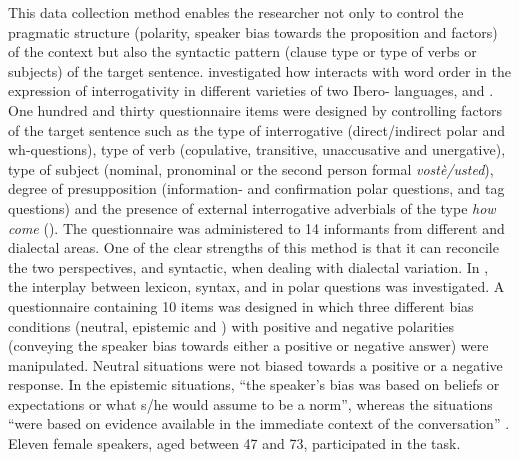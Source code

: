 \documentclass[output=paper]{LSP/langsci}
\begin{document}
This data collection method enables the researcher not only to control the pragmatic structure (polarity, speaker bias towards the proposition and  factors) of the context but also the syntactic pattern (clause type or type of verbs or subjects) of the target sentence. \citet{Vanrell2014dialectinterrogatives} investigated how  interacts with word order in the expression of interrogativity in different varieties of two Ibero- languages,  and . One hundred and thirty questionnaire items were designed by controlling factors of the target sentence such as the type of interrogative (direct/indirect polar and wh-questions), type of verb (copulative, transitive, unaccusative and unergative), type of subject (nominal, pronominal or the second person formal \textit{vostè/usted}), degree of presupposition (information- and confirmation polar questions, and tag questions) and the presence of external interrogative adverbials of the type \textit{how come} (\citealt{Rizzi2001}). The questionnaire was administered to 14 informants from different  and  dialectal areas. One of the clear strengths of this method is that it can reconcile the two perspectives,  and syntactic, when dealing with dialectal variation. In \citet{Vanrell2014sardinianpolar}, the interplay between lexicon, syntax,  and  in  polar questions was investigated. A questionnaire containing 10 items was designed in which three different bias conditions (neutral, epistemic and ) with positive and negative polarities (conveying the speaker bias towards either a positive or negative answer) were manipulated. Neutral situations were not biased towards a positive or a negative response. In the epistemic situations, “the speaker’s bias was based on beliefs or expectations or what s/he would assume to be a norm”, whereas the  situations “were based on evidence available in the immediate context of the conversation” \citep[4]{Vanrell2014sardinianpolar}. Eleven  female speakers, aged between 47 and 73, participated in the task. 
\end{document}
